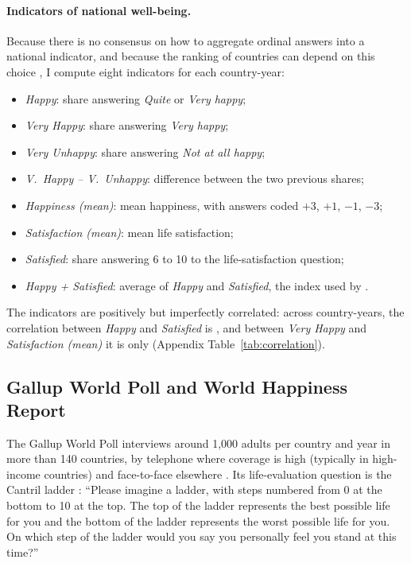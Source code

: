 \documentclass[12pt]{article}
\begin{document}
\ifshowregion
\paragraph{Indicators of national well-being.}
Because there is no consensus on how to aggregate ordinal answers into a national indicator, and because the ranking of countries can depend on this choice \citep{bond_sad_2019}, I compute eight indicators for each country-year:
\begin{itemize}
    \item \textit{Happy}: share answering \textit{Quite} or \textit{Very happy};
    \item \textit{Very Happy}: share answering \textit{Very happy};
    \item \textit{Very Unhappy}: share answering \textit{Not at all happy};
    \item \textit{V.~Happy -- V.~Unhappy}: difference between the two previous shares;
    \item \textit{Happiness (mean)}: mean happiness, with answers coded $+3$, $+1$, $-1$, $-3$;
    \item \textit{Satisfaction (mean)}: mean life satisfaction;
    \item \textit{Satisfied}: share answering 6 to 10 to the life-satisfaction question;
    \item \textit{Happy + Satisfied}: average of \textit{Happy} and \textit{Satisfied}, the index used by \citet{inglehart_genes_2000}.
\end{itemize}
The indicators are positively but imperfectly correlated: across country-years, the correlation between \textit{Happy} and \textit{Satisfied} is \corHappySatisfied, and between \textit{Very Happy} and \textit{Satisfaction (mean)} it is only \corVeryHappySatisfiedMean (Appendix Table~\ref{tab:correlation}).
\fi

\subsection{Gallup World Poll and World Happiness Report}\label{subsec:gallup}

The Gallup World Poll interviews around 1,000 adults per country and year in more than 140 countries, by telephone where coverage is high (typically in high-income countries) and face-to-face elsewhere \citep{gallup_methodology_2022}. Its life-evaluation question is the Cantril ladder \citep{cantril_pattern_1965}: ``Please imagine a ladder, with steps numbered from 0 at the bottom to 10 at the top. The top of the ladder represents the best possible life for you and the bottom of the ladder represents the worst possible life for you. On which step of the ladder would you say you personally feel you stand at this time?''
\end{document}
